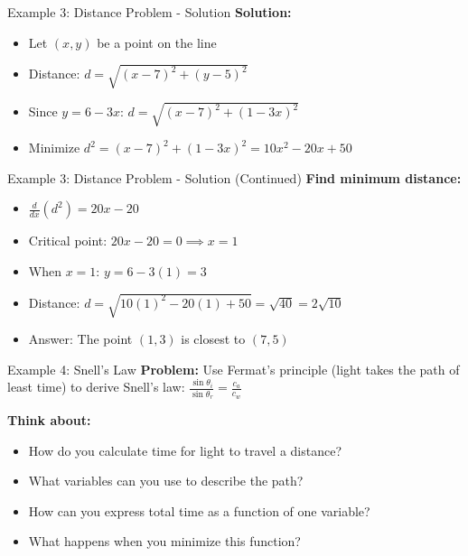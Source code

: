 \documentclass[aspectratio=169]{beamer}
\begin{document}
\begin{frame}{Example 3: Distance Problem - Solution}
\textbf{Solution:}
\begin{itemize}
    \item Let $(x,y)$ be a point on the line
    \item Distance: $d = \sqrt{(x-7)^2 + (y-5)^2}$
    \item Since $y = 6 - 3x$: $d = \sqrt{(x-7)^2 + (1-3x)^2}$
    \item Minimize $d^2 = (x-7)^2 + (1-3x)^2 = 10x^2 - 20x + 50$
\end{itemize}
\end{frame}

\begin{frame}{Example 3: Distance Problem - Solution (Continued)}
\textbf{Find minimum distance:}
\begin{itemize}
    \item $\frac{d}{dx}(d^2) = 20x - 20$
    \item Critical point: $20x - 20 = 0 \implies x = 1$
    \item When $x = 1$: $y = 6 - 3(1) = 3$
    \item Distance: $d = \sqrt{10(1)^2 - 20(1) + 50} = \sqrt{40} = 2\sqrt{10}$
    \item Answer: The point $(1,3)$ is closest to $(7,5)$
\end{itemize}
\end{frame}

\begin{frame}{Example 4: Snell's Law}
\textbf{Problem:} Use Fermat's principle (light takes the path of least time) to derive Snell's law: $\frac{\sin \theta_i}{\sin \theta_r} = \frac{c_a}{c_w}$

\textbf{Think about:}
\begin{itemize}
    \item How do you calculate time for light to travel a distance?
    \item What variables can you use to describe the path?
    \item How can you express total time as a function of one variable?
    \item What happens when you minimize this function?
\end{itemize}
\end{frame}
\end{document}
